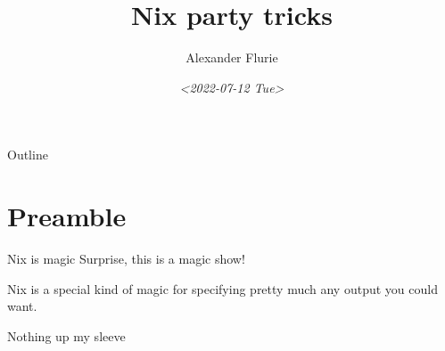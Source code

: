 \documentclass[bigger]{beamer}
\author{Alexander Flurie}
\date{\textit{<2022-07-12 Tue>}}
\title{Nix party tricks}
\begin{document}
\maketitle
\begin{frame}{Outline}
\tableofcontents
\end{frame}


\section{Preamble}
\label{sec:orga7d1e72}
\begin{frame}[label={sec:orge0f59e0}]{Nix is magic}
Surprise, this is a magic show!

Nix is a special kind of magic for specifying pretty much any output you could want.
\end{frame}
\begin{frame}[label={sec:org528fef1}]{Nothing up my sleeve}
\end{frame}
\end{document}
